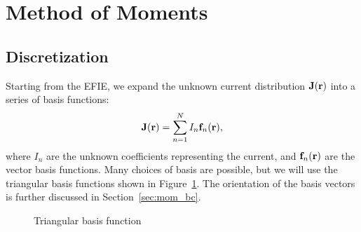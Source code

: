 \section{Method of Moments}

\subsection{Discretization}
Starting from the EFIE, we expand the unknown current distribution $\mathbf{J}(\mathbf{r})$ into a series of basis functions:
\begin{equation}
	\mathbf{J}(\mathbf{r}) = \sum_{n = 1}^{N} I_n \mathbf{f}_n(\mathbf{r}),
	\label{eq:j_exp}
\end{equation}
where $I_n$ are the unknown coefficients representing the current, and $\mathbf{f}_n(\mathbf{r})$ are the vector basis functions. Many choices of basis  are possible, but we will use the triangular basis functions shown in Figure~\ref{fig:mom_basis}. The orientation of the basis vectors is further discussed in Section~\ref{sec:mom_bc}.
\begin{figure}[!ht]
	\centering
	
	\caption{Triangular basis function}
	\label{fig:mom_basis}
\end{figure}

